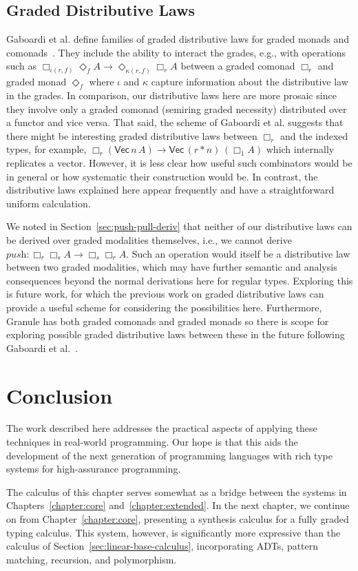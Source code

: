 \subsection{Graded Distributive Laws}
Gaboardi et al. define families of graded distributive laws for graded monads
and comonads~\citep{combining2016}. They include the ability to interact the
grades, e.g., with operations such as $\Box_{\iota(r,f)} \Diamond_f A
\rightarrow \Diamond_{\kappa(r,f)} \Box_r A$ between a graded comonad $\Box_r$
and graded monad $\Diamond_f$ where $\iota$ and $\kappa$ capture information
about the distributive law in the grades. In comparison, our distributive laws
here are more prosaic since they involve only a graded comonad (semiring graded
necessity) distributed over a functor and vice versa. That said, the scheme of
Gaboardi et al. suggests that there might be interesting graded distributive
laws between $\Box_r$ and the indexed types, for example, $\Box_r
(\mathsf{Vec}\, n \, A) \rightarrow \mathsf{Vec}\, (r * n) \, (\Box_1 A)$ which
internally replicates a vector. However, it is less clear how useful such
combinators would be in general or how systematic their construction would be.
In contrast, the distributive laws explained here appear frequently and have a
straightforward uniform calculation.

We noted in Section~\ref{sec:push-pull-deriv} that neither of our distributive laws
can be derived over graded modalities themselves, i.e., we cannot derive
$\textit{push} : \Box_r \Box_s A \rightarrow \Box_s \Box_r A$. Such an operation
would itself be a distributive law between two graded modalities, which may have
further semantic and analysis consequences beyond the normal derivations here
for regular types. Exploring this is future work, for which the previous work on
graded distributive laws can provide a useful scheme for considering the
possibilities here. Furthermore, Granule has both graded comonads and graded
monads so there is scope for exploring possible graded distributive laws between
these in the future following Gaboardi et al.~\citep{combining2016}.

\section{Conclusion}
\label{sec:der-conclusion}

The work described here addresses the practical aspects of applying these
techniques in real-world programming. Our hope is that this aids the development
of the next generation of programming languages with rich type systems for
high-assurance programming.

The calculus of this chapter serves somewhat as a bridge between the systems in
Chapters~\ref{chapter:core} and~\ref{chapter:extended}. In the next chapter, we
continue on from Chapter~\ref{chapter:core}, presenting a synthesis calculus for
a fully graded typing calculus. This system, however, is significantly more
expressive than the calculus of Section~\ref{sec:linear-base-calculus},
incorporating ADTs, pattern matching, recursion, and  
polymorphism. 